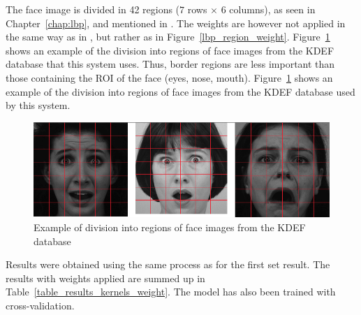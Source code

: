 \noindent The face image is divided in 42 regions ($ 7 $ rows $\times$ $ 6 $ columns), as seen in Chapter~\ref{chap:lbp}, and mentioned in \cite{GAN08}. The weights are however not applied in the same way as in \cite{GAN08}, but rather as in Figure~\ref{lbp_region_weight}. Figure~\ref{implementation_weight_example} shows an example of the division into regions of face images from the KDEF database that this system uses. Thus, border regions are less important than those containing the ROI of the face (eyes, nose, mouth). Figure~\ref{implementation_weight_example} shows an example of the division into regions of face images from the KDEF database used by this system.
\newline

\begin{figure}[!h]
\begin{center}
\noindent \includegraphics[scale=0.4]{figures/implementation_weight_example} 
\newline
\caption{Example of division into regions of face images from the KDEF database}
\label{implementation_weight_example}
\end{center} 
\end{figure}

\noindent Results were obtained using the same process as for the first set result. The results with weights applied are summed up in Table~\ref{table_results_kernels_weight}. The model has also been trained with cross-validation.
\newline

